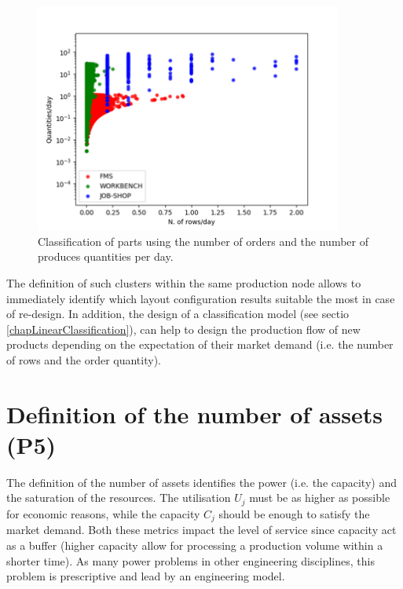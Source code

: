 \begin{figure}[hbt!]
\centering
\includegraphics[width=0.9\textwidth]{sectionProduction/design_plant_figures/fig_prod_flexauto3.png}
\captionsetup{type=figure}
\caption{Classification of parts using the number of orders and the number of produces quantities per day.}
\label{fig_prod_flexauto3}
\end{figure}

The definition of such clusters within the same production node allows to immediately identify which layout configuration results suitable the most in case of re-design. In addition, the design of a classification model (see sectio \ref{chapLinearClassification}), can help to design the production flow of new products depending on the expectation of their market demand (i.e. the number of rows and the order quantity).

\section{Definition of the number of assets (P5)}
The definition of the number of assets identifies the power (i.e. the capacity) and the saturation of the resources. The utilisation $U_j$ must be as higher as possible for economic reasons, while the capacity $C_j$ should be enough to satisfy the market demand. Both these metrics impact the level of service since capacity act as a buffer (higher capacity allow for processing a production volume within a shorter time). As many power problems in other engineering disciplines, this problem is prescriptive and lead by an engineering model.

